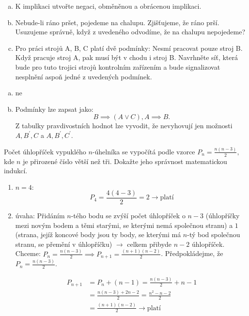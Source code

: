 \begin{example}[ŘMÚ 275/28.6]
  \begin{enumerate}[a.]
    \item K implikaci   utvořte
negaci, obměněnou a obrácenou implikaci.
\item Nebude-li ráno pršet, pojedeme na chalupu. Zjišťujeme, že ráno prší. Usuzujeme správně, když z uvedeného
odvodíme, že na chalupu nepojedeme?
\item Pro práci strojů A, B, C platí dvě podmínky: Nesmí pracovat pouze stroj B. Když pracuje stroj A, pak musí
být v chodu i stroj B. Navrhněte síť, která bude pro tuto trojici strojů kontrolním zařízením a bude
signalizovat nesplnění aspoň jedné z uvedených podmínek.
  \end{enumerate}
  \vspace{3em}
  \rm
  \begin{enumerate}[a.]
    negace: , obměna: , obrácení: .
    \item ne
    \item Podmínky lze zapsat jako:
      $$B\implies (A\lor C), A\implies B.$$
    Z tabulky pravdivostních hodnot lze vyvodit, že nevyhovují jen možnosti $A, B^\prime, C$ a $A, B^\prime, C^\prime$.
  \end{enumerate}
\end{example}

\begin{example}[SÚM 240/1]
  Počet úhlopříček vypuklého $n$-úhelníka se vypočítá podle vzorce $P_n=\frac{n(n-3)}{2},$ kde $n$ je přirozené číslo větší než tři. Dokažte jeho správnost matematickou indukcí.

  \rm \begin{enumerate}[$i.$]
    \item $n=4:$
    $$P_4 = \frac{4(4-3)}{2}=2 \rightarrow \textrm{platí}$$
    \item úvaha: Přidáním $n$-tého bodu se zvýší počet úhlopříček o $n-3$ (úhlopříčky mezi novým bodem a těmi starými, se kterými nemá společnou stranu) a $1$ (strana, jejíž koncové body jsou ty body, se kterými má $n$-tý bod společnou stranu, se přemění v úhlopříčku) $\rightarrow$ celkem přibyde $n-2$ úhlopříček. \\
    Chceme: $P_n=\frac{n(n-3)}{2}\implies P_{n+1}=\frac{(n+1)(n-2)}{2}$. Předpokládejme, že $P_n=\frac{n(n-3)}{2}$.

    \begin{align*}
      P_{n+1} & =P_n + (n-1) = \frac{n(n-3)}{2}+n-1 \\
      & =\frac{n(n-3)+2n-2}{2} = \frac{n^2-n-2}{2}\\
      & = \frac{(n+1)(n-2)}{2} \rightarrow \textrm{platí}
    \end{align*}
\end{enumerate}
\end{example}

